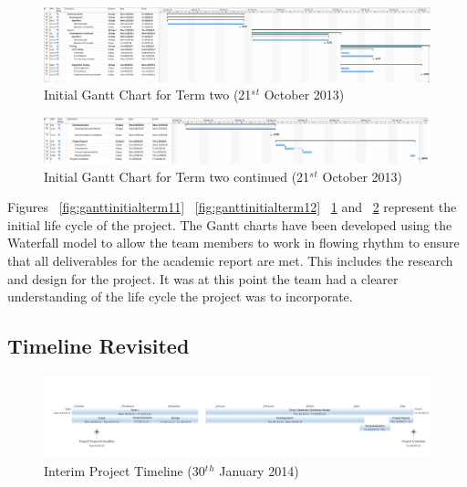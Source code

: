 \begin{landscape}
\begin{figure}[H]
  \centering
  \includegraphics[width=\linewidth]{images/initial_term2_1.png}
  \caption{Initial Gantt Chart for Term two (21$^s$$^t$ October 2013)}
  \label{fig:ganttinitialterm21}
\end{figure}

\begin{figure}[H]
  \centering
  \includegraphics[width=\linewidth]{images/initial_term2_2.png}
  \caption{Initial Gantt Chart for Term two continued (21$^s$$^t$ October 2013)}
  \label{fig:ganttinitialterm22}
\end{figure}


Figures ~\ref{fig:ganttinitialterm11} ~\ref{fig:ganttinitialterm12} ~\ref{fig:ganttinitialterm21} and ~\ref{fig:ganttinitialterm22} represent
the initial life cycle of the project. The Gantt charts have been developed
using the Waterfall model to allow the team members to work in flowing rhythm to
ensure that all deliverables for the academic report are met. This includes the
research and design for the project. It was at this point the team had a clearer
understanding of the life cycle the project was to incorporate.


\newpage
\subsection{Timeline Revisited}

\begin{figure}[H]
  \centering
  \includegraphics[width=\linewidth]{images/timeline2.png}
  \caption{Interim Project Timeline (30$^t$$^h$ January 2014)}
  \label{fig:timeline2}
\end{figure}


\end{landscape}
